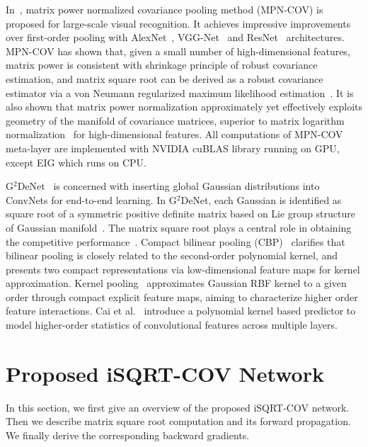 \documentclass[10pt,twocolumn,letterpaper]{article}
\begin{document}
In~\cite{Li_2017_ICCV}, matrix power normalized covariance pooling method (MPN-COV) is proposed  for large-scale visual recognition. It achieves impressive  improvements over first-order pooling with  AlexNet~\cite{Krizhevsky2012ImageNet}, VGG-Net~\cite{DBLP:conf/bmvc/ChatfieldSVZ14,Simonyan15} and ResNet~\cite{He_2016_CVPR} architectures. MPN-COV has shown that,  given a small number of high-dimensional features,  matrix power is consistent with shrinkage principle of robust covariance estimation, and matrix square root can be derived as a robust covariance estimator via  a von Neumann regularized maximum likelihood estimation~\cite{Wang_2016_CVPR}. It is also shown that matrix power normalization approximately yet effectively exploits geometry of the manifold of covariance matrices, superior to matrix logarithm normalization~\cite{Ionescu_2015_ICCV} for high-dimensional  features. All computations of MPN-COV meta-layer are implemented with NVIDIA cuBLAS library running on GPU, except EIG which runs on CPU.

G$^2$DeNet~\cite{Wang_2017_CVPR} is concerned with inserting global Gaussian distributions into  ConvNets for end-to-end learning. In G$^2$DeNet, each Gaussian  is identified as square root of a symmetric positive definite matrix based on Lie group structure of Gaussian manifold~\cite{LE2MG}. The matrix square root  plays a central role in obtaining the competitive performance~\cite[Tab. 1 \& Tab. 5]{Wang_2017_CVPR}.   Compact bilinear pooling (CBP)~\cite{Gao_2016_CVPR} clarifies that bilinear pooling is closely related to the second-order polynomial kernel, and presents two compact representations via low-dimensional feature maps for kernel approximation. Kernel pooling~\cite{Cui_2017_CVPR} approximates Gaussian RBF kernel to a given order through compact explicit feature maps, aiming to characterize higher order feature interactions.  Cai et al.~\cite{Cai_2017_ICCV} introduce a polynomial kernel based predictor to model higher-order statistics of convolutional features across multiple layers. 




\section{Proposed iSQRT-COV Network}\label{section:proposed-method}

In this section, we first give an overview of the proposed iSQRT-COV network. Then we describe matrix square root computation and its forward  propagation. We finally  derive the corresponding backward gradients.
\end{document}
